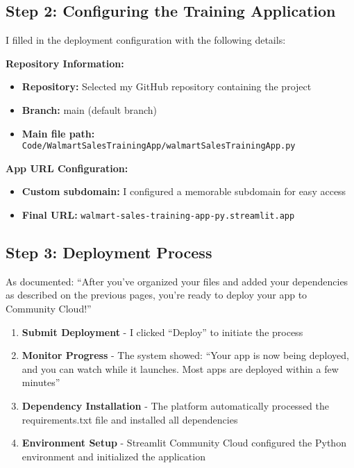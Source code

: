 \subsection{Step 2: Configuring the Training Application}

I filled in the deployment configuration with the following details:

\textbf{Repository Information:}
\begin{itemize}
\item \textbf{Repository:} Selected my GitHub repository containing the project
\item \textbf{Branch:} main (default branch)
\item \textbf{Main file path:} \texttt{Code/WalmartSalesTrainingApp/walmartSalesTrainingApp.py}
\end{itemize}

\textbf{App URL Configuration:}
\begin{itemize}
\item \textbf{Custom subdomain:} I configured a memorable subdomain for easy access
\item \textbf{Final URL:} \texttt{walmart-sales-training-app-py.streamlit.app}
\end{itemize}

\subsection{Step 3: Deployment Process}

As documented: ``After you've organized your files and added your dependencies as described on the previous pages, you're ready to deploy your app to Community Cloud!'' \cite{Streamlit:2024deploy}

\begin{enumerate}
\item \textbf{Submit Deployment} - I clicked ``Deploy'' to initiate the process
\item \textbf{Monitor Progress} - The system showed: ``Your app is now being deployed, and you can watch while it launches. Most apps are deployed within a few minutes'' \cite{Streamlit:2024deploy}
\item \textbf{Dependency Installation} - The platform automatically processed the requirements.txt file and installed all dependencies
\item \textbf{Environment Setup} - Streamlit Community Cloud configured the Python environment and initialized the application
\end{enumerate}


